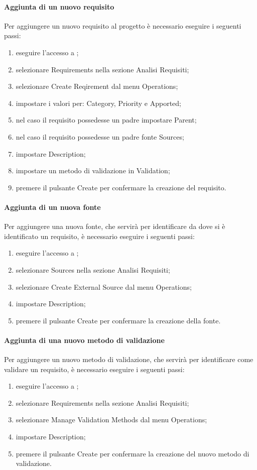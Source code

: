\documentclass[12pt,a4paper]{article}
\begin{document}
\paragraph{Aggiunta di un nuovo requisito}
Per aggiungere un nuovo requisito al progetto è necessario eseguire i seguenti passi:
\begin{enumerate}
	\item eseguire l'accesso a ;
	\item selezionare Requirements nella sezione Analisi Requisiti;
	\item selezionare Create Reqirement dal menu Operations;
	\item impostare i valori per: Category, Priority e Apported;
	\item nel caso il requisito possedesse un padre impostare Parent;
	\item nel caso il requisito possedesse un padre fonte Sources;
	\item impostare Description; 
	\item impostare un metodo di validazione in Validation;
	\item premere il pulsante Create per confermare la creazione del requisito.
\end{enumerate}

\paragraph{Aggiunta di un nuova fonte}
Per aggiungere una nuova fonte, che servirà per identificare da dove si è identificato un requisito, è necessario eseguire i seguenti passi: 
\begin{enumerate}
	\item eseguire l'accesso a ;
	\item selezionare Sources nella sezione Analisi Requisiti;
	\item selezionare Create External Source dal menu Operations;
	\item impostare Description; 
	\item premere il pulsante Create per confermare la creazione della fonte.
\end{enumerate}

\paragraph{Aggiunta di una nuovo metodo di validazione}
Per aggiungere un nuovo metodo di validazione, che servirà per identificare come validare un requisito, è necessario eseguire i seguenti passi: 
\begin{enumerate}
	\item eseguire l'accesso a ;
	\item selezionare Requirements nella sezione Analisi Requisiti;
	\item selezionare Manage Validation Methods dal menu Operations;
	\item impostare Description; 
	\item premere il pulsante Create per confermare la creazione del nuovo metodo di validazione.
\end{enumerate}
\end{document}
